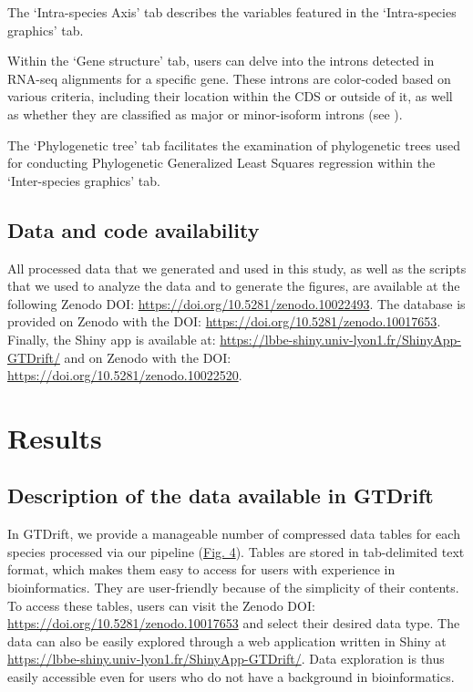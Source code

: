The `Intra-species Axis' tab describes the variables featured in the `Intra-species graphics' tab.

Within the `Gene structure' tab, users can delve into the introns detected in RNA-seq alignments for a specific gene. These introns are color-coded based on various criteria, including their location within the CDS or outside of it, as well as whether they are classified as major or minor-isoform introns (see ).

The `Phylogenetic tree' tab facilitates the examination of phylogenetic trees used for conducting Phylogenetic Generalized Least Squares regression within the `Inter-species graphics' tab.

\subsection{Data and code availability}
All processed data that we generated and used in this study, as well as the scripts that we used to analyze the data and to generate the figures, are available at the following Zenodo DOI: \url{https://doi.org/10.5281/zenodo.10022493}. 
The database is provided on Zenodo with the DOI: \url{https://doi.org/10.5281/zenodo.10017653}.
Finally, the Shiny app is available at: \url{https://lbbe-shiny.univ-lyon1.fr/ShinyApp-GTDrift/} and on Zenodo with the DOI: \url{https://doi.org/10.5281/zenodo.10022520}.

\section{Results}
\subsection{Description of the data available in GTDrift}
\label{sec:datarecords}

In GTDrift, we provide a manageable number of compressed data tables for each species processed via our pipeline (\hyperref[fig:gtdrift4]{Fig. 4}). Tables are stored in tab-delimited text format, which makes them easy to access for users with experience in bioinformatics. They are user-friendly because of the simplicity of their contents. To access these tables, users can visit the Zenodo DOI: \url{https://doi.org/10.5281/zenodo.10017653} and select their desired data type. The data can also be easily explored through a web application written in Shiny at \url{https://lbbe-shiny.univ-lyon1.fr/ShinyApp-GTDrift/}. Data exploration is thus easily accessible even for users who do not have a background in bioinformatics. 

